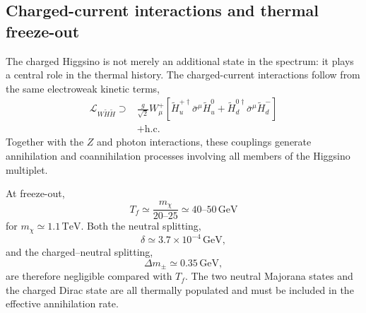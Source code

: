 \documentclass[aps,prd,reprint,superscriptaddress,nofootinbib,longbibliography,floatfix]{revtex4-2}
\newcommand{\GeV}{\mathrm{GeV}}
\newcommand{\TeV}{\mathrm{TeV}}
\begin{document}
\subsection{Charged-current interactions and thermal freeze-out}

The charged Higgsino is not merely an additional state in the spectrum: it plays a central role in the thermal history. The charged-current interactions follow from the same electroweak kinetic terms,
\begin{align}
\mathcal{L}_{W\widetilde H\widetilde H}
\supset{}&
\frac{g}{\sqrt{2}}
W_\mu^+
\left[
\widetilde H_u^{+\dagger}
\bar\sigma^\mu
\widetilde H_u^0
+
\widetilde H_d^{0\dagger}
\bar\sigma^\mu
\widetilde H_d^-
\right]
\nonumber\\
&
+\mathrm{h.c.}
\label{eq:higgsino_W_coupling}
\end{align}
Together with the $Z$ and photon interactions, these couplings generate annihilation and coannihilation processes involving all members of the Higgsino multiplet.

At freeze-out,
\begin{equation}
T_f
\simeq
\frac{m_\chi}{20\text{--}25}
\simeq
40\text{--}50\,\GeV
\end{equation}
for $m_\chi\simeq1.1\,\TeV$. Both the neutral splitting,
\begin{equation}
\delta\simeq3.7\times10^{-4}\,\GeV,
\end{equation}
and the charged--neutral splitting,
\begin{equation}
\Delta m_\pm\simeq0.35\,\GeV,
\end{equation}
are therefore negligible compared with $T_f$. The two neutral Majorana states and the charged Dirac state are all thermally populated and must be included in the effective annihilation rate.
\end{document}
